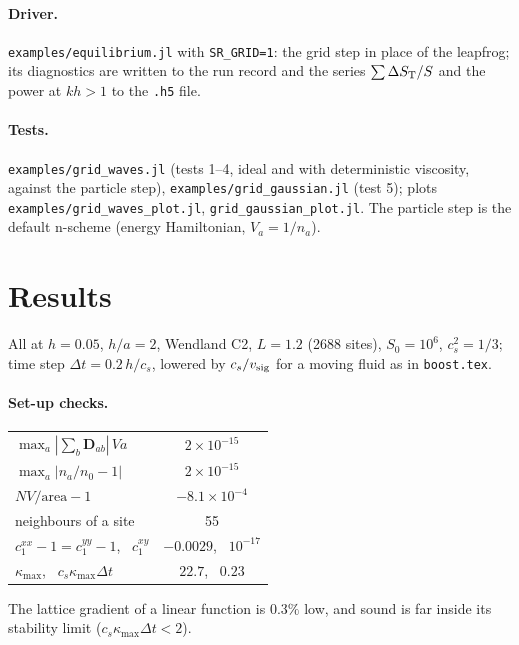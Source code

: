 \documentclass[11pt,aps,preprint,nofootinbib,superscriptaddress,tightenlines]{revtex4-2}
\let\oldparagraph\paragraph
\renewcommand{\paragraph}{\par\bigskip\oldparagraph}
\begin{document}
\paragraph{Driver.}  \texttt{examples/equilibrium.jl} with \texttt{SR\_GRID=1}: the grid step in
place of the leapfrog; its diagnostics are written to the run record and the series
$\sum\Delta S_{\rm T}/S$ and the power at $kh>1$ to the \texttt{.h5} file.

\paragraph{Tests.}  \texttt{examples/grid\_waves.jl} (tests 1--4, ideal and with deterministic viscosity,
against the particle step), \texttt{examples/grid\_gaussian.jl} (test 5); plots
\texttt{examples/grid\_waves\_plot.jl}, \texttt{grid\_gaussian\_plot.jl}.  The particle step is the default
n-scheme (energy Hamiltonian, $V_a=1/n_a$).

\section{Results}
\label{sec:results}

All at $h=0.05$, $h/a=2$, Wendland C2, $L=1.2$ (2688 sites), $S_0=10^6$, $c_s^2=1/3$; time step
$\Delta t=0.2\,h/c_s$, lowered by $c_s/v_{\rm sig}$ for a moving fluid as in \texttt{boost.tex}.

\paragraph{Set-up checks.}
\begin{center}
\begin{tabular}{lc}
\hline
$\max_a|\sum_b\bm D_{ab}|\,Va$ & $2\times10^{-15}$ \\
$\max_a|n_a/n_0-1|$ & $2\times10^{-15}$ \\
$NV/\text{area}-1$ & $-8.1\times10^{-4}$ \\
neighbours of a site & 55 \\
$c_1^{xx}-1=c_1^{yy}-1$, \ $c_1^{xy}$ & $-0.0029$, \ $10^{-17}$ \\
$\kappa_{\max}$, \ $c_s\kappa_{\max}\Delta t$ & $22.7$, \ $0.23$ \\
\hline
\end{tabular}
\end{center}
The lattice gradient of a linear function is $0.3\%$ low, and sound is far inside its stability
limit ($c_s\kappa_{\max}\Delta t<2$).
\end{document}
